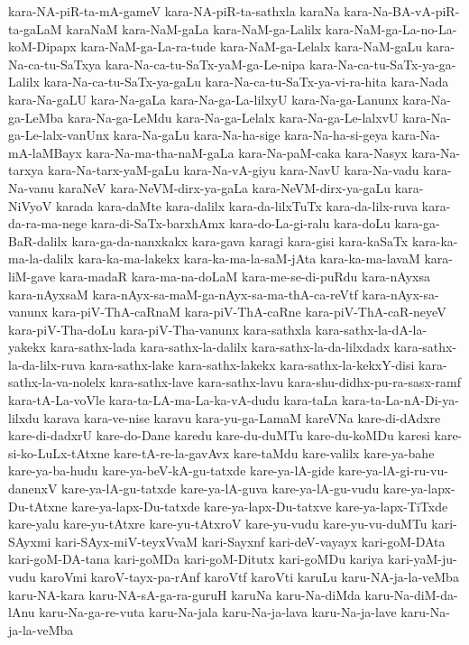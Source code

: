 {kara-NA-piR-ta-mA-gameV
kara-NA-piR-ta-sathxla
karaNa
kara-Na-BA-vA-piR-ta-gaLaM
karaNaM
kara-NaM-gaLa
kara-NaM-ga-Lalilx
kara-NaM-ga-La-no-La-koM-Dipapx
kara-NaM-ga-La-ra-tude
kara-NaM-ga-Lelalx
kara-NaM-gaLu
kara-Na-ca-tu-SaTxya
kara-Na-ca-tu-SaTx-yaM-ga-Le-nipa
kara-Na-ca-tu-SaTx-ya-ga-Lalilx
kara-Na-ca-tu-SaTx-ya-gaLu
kara-Na-ca-tu-SaTx-ya-vi-ra-hita
kara-Nada
kara-Na-gaLU
kara-Na-gaLa
kara-Na-ga-La-lilxyU
kara-Na-ga-Lanunx
kara-Na-ga-LeMba
kara-Na-ga-LeMdu
kara-Na-ga-Lelalx
kara-Na-ga-Le-lalxvU
kara-Na-ga-Le-lalx-vanUnx
kara-Na-gaLu
kara-Na-ha-sige
kara-Na-ha-si-geya
kara-Na-mA-laMBayx
kara-Na-ma-tha-naM-gaLa
kara-Na-paM-caka
kara-Nasyx
kara-Na-tarxya
kara-Na-tarx-yaM-gaLu
kara-Na-vA-giyu
kara-NavU
kara-Na-vadu
kara-Na-vanu
karaNeV
kara-NeVM-dirx-ya-gaLa
kara-NeVM-dirx-ya-gaLu
kara-NiVyoV
karada
kara-daMte
kara-dalilx
kara-da-lilxTuTx
kara-da-lilx-ruva
kara-da-ra-ma-nege
kara-di-SaTx-barxhAmx
kara-do-La-gi-ralu
kara-doLu
kara-ga-BaR-dalilx
kara-ga-da-nanxkakx
kara-gava
karagi
kara-gisi
kara-kaSaTx
kara-ka-ma-la-dalilx
kara-ka-ma-lakekx
kara-ka-ma-la-saM-jAta
kara-ka-ma-lavaM
kara-liM-gave
kara-madaR
kara-ma-na-doLaM
kara-me-se-di-puRdu
kara-nAyxsa
kara-nAyxsaM
kara-nAyx-sa-maM-ga-nAyx-sa-ma-thA-ca-reVtf
kara-nAyx-sa-vanunx
kara-piV-ThA-caRnaM
kara-piV-ThA-caRne
kara-piV-ThA-caR-neyeV
kara-piV-Tha-doLu
kara-piV-Tha-vanunx
kara-sathxla
kara-sathx-la-dA-la-yakekx
kara-sathx-lada
kara-sathx-la-dalilx
kara-sathx-la-da-lilxdadx
kara-sathx-la-da-lilx-ruva
kara-sathx-lake
kara-sathx-lakekx
kara-sathx-la-kekxY-disi
kara-sathx-la-va-nolelx
kara-sathx-lave
kara-sathx-lavu
kara-shu-didhx-pu-ra-sasx-ramf
kara-tA-La-voVle
kara-ta-LA-ma-La-ka-vA-dudu
kara-taLa
kara-ta-La-nA-Di-ya-lilxdu
karava
kara-ve-nise
karavu
kara-yu-ga-LamaM
kareVNa
kare-di-dAdxre
kare-di-dadxrU
kare-do-Dane
karedu
kare-du-duMTu
kare-du-koMDu
karesi
kare-si-ko-LuLx-tAtxne
kare-tA-re-la-gavAvx
kare-taMdu
kare-valilx
kare-ya-bahe
kare-ya-ba-hudu
kare-ya-beV-kA-gu-tatxde
kare-ya-lA-gide
kare-ya-lA-gi-ru-vu-danenxV
kare-ya-lA-gu-tatxde
kare-ya-lA-guva
kare-ya-lA-gu-vudu
kare-ya-lapx-Du-tAtxne
kare-ya-lapx-Du-tatxde
kare-ya-lapx-Du-tatxve
kare-ya-lapx-TiTxde
kare-yalu
kare-yu-tAtxre
kare-yu-tAtxroV
kare-yu-vudu
kare-yu-vu-duMTu
kari-SAyxmi
kari-SAyx-miV-teyxVvaM
kari-Sayxnf
kari-deV-vayayx
kari-goM-DAta
kari-goM-DA-tana
kari-goMDa
kari-goM-Ditutx
kari-goMDu
kariya
kari-yaM-ju-vudu
karoVmi
karoV-tayx-pa-rAnf
karoVtf
karoVti
karuLu
karu-NA-ja-la-veMba
karu-NA-kara
karu-NA-sA-ga-ra-guruH
karuNa
karu-Na-diMda
karu-Na-diM-da-lAnu
karu-Na-ga-re-vuta
karu-Na-jala
karu-Na-ja-lava
karu-Na-ja-lave
karu-Na-ja-la-veMba
}
